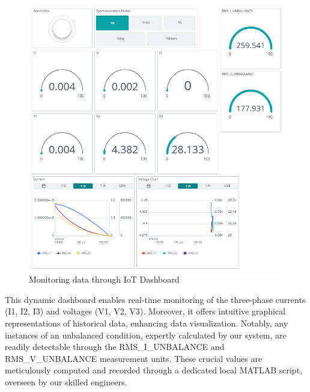 \begin{figure}[htbp]
\includegraphics[scale=0.6]{images/Dashboard3.png}
\caption{Monitoring data through IoT Dashboard}
\label{fig:x IoT_Dashboard}
\end{figure}

This dynamic dashboard enables real-time monitoring of the three-phase currents (I1, I2, I3) and voltages (V1, V2, V3). Moreover, it offers intuitive graphical representations of historical data, enhancing data visualization. Notably, any instances of an unbalanced condition, expertly calculated by our system, are readily detectable through the RMS\_I\_UNBALANCE and RMS\_V\_UNBALANCE measurement units. These crucial values are meticulously computed and recorded through a dedicated local MATLAB script, overseen by our skilled engineers.

